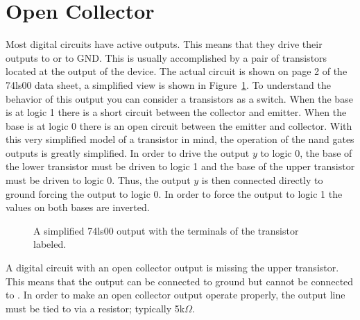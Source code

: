             \section{Open Collector}
            Most digital circuits have active outputs.  This means that they drive
            their outputs to \VCC or to GND.  This is usually accomplished
            by a pair of transistors located at the output of the device.  The
            actual circuit is shown on page 2 of the 74ls00 data sheet,
            a simplified view is shown in Figure~\ref{fig:transistor}.  To
            understand the behavior of this output you can consider
            a transistors as a switch.  When the base is at logic 1 there is
            a short circuit between the collector and emitter.  When the base is
            at logic 0 there is an open circuit between the emitter and
            collector.  With this very simplified model of a transistor in mind,
            the operation of the nand gates outputs is greatly simplified.  In
            order to drive the output $y$ to logic 0, the base of the lower
            transistor must be driven to logic 1 and the base of the upper
            transistor must be driven to logic 0.  Thus, the output $y$ is then
            connected directly to ground forcing the output to logic 0.  In order
            to force the output to logic 1 the values on both bases are inverted.

            \begin{figure}[ht]
                \caption{A simplified 74ls00 output with the terminals of the
                transistor labeled.}
                \label{fig:transistor}
            \end{figure}

            A digital circuit with an open collector output is missing the upper
            transistor.  This means that the output can be connected to ground
            but cannot be connected to \VCC.  In order to make an open collector
            output operate properly, the output line must be tied to \VCC via
            a resistor; typically 5k$\Omega$.
